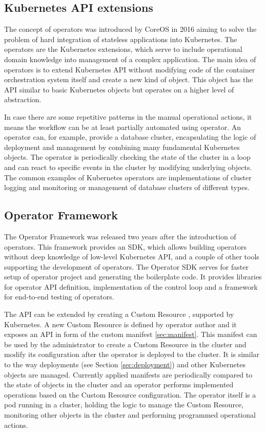 \documentclass[
  digital, %
  twoside, %
  table,   %
  nolof,   %
  nolot,   %
]{fithesis3}
\begin{document}
\subsection{Kubernetes API extensions}
The concept of operators \cite{kubernetes-operator} was introduced by CoreOS \cite{operators} in 2016 aiming to solve the problem of hard integration of stateless applications into Kubernetes. The operators are the Kubernetes extensions, which serve to include operational domain knowledge into management of a complex application. The main idea of operators is to extend Kubernetes API without modifying code of the container orchestration system itself and create a new kind of object. This object has the API similar to basic Kubernetes objects but operates on a higher level of abstraction.

In case there are some repetitive patterns in the manual operational actions, it means the workflow can be at least partially automated using operator. An operator can, for example, provide a database cluster, encapsulating the logic of deployment and management by combining many fundamental Kubernetes objects. The operator is periodically checking the state of the cluster in a loop and can react to specific events in the cluster by modifying underlying objects. The common examples of Kubernetes operators are implementations of cluster logging and monitoring or management of database clusters of different types.

\subsection{Operator Framework} \label{sec:operator_framework}
The Operator Framework \cite{operator-framework} was released two years after the introduction of operators. This framework provides an SDK, which allows building operators without deep knowledge of low-level Kubernetes API, and a couple of other tools supporting the development of operators. The Operator SDK serves for faster setup of operator project and generating the boilerplate code. It provides libraries for operator API definition, implementation of the control loop and a framework for end-to-end testing of operators.

The API can be extended by creating a Custom Resource \cite{custom-resources}, supported by Kubernetes. A new Custom Resource is defined by operator author and it exposes an API in form of the custom manifest \ref{sec:manifest}. This manifest can be used by the administrator to create a Custom Resource in the cluster and modify its configuration after the operator is deployed to the cluster. It is similar to the way deployments (see Section \ref{sec:deployment}) and other Kubernetes objects are managed. Currently applied manifests are periodically compared to the state of objects in the cluster and an operator performs implemented operations based on the Custom Resource configuration. The operator itself is a pod running in a cluster, holding the logic to manage the Custom Resource, monitoring other objects in the cluster and performing programmed operational actions.
\end{document}

